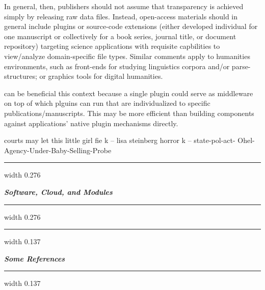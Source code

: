 \documentclass[11pt]{article}
\newcommand{\semihr}[1]{{\textcolor{orange!60!black}{\hrule width #1}}}
\newcommand{\sectnum}[1]{\hspace*{25pt}\textcolor{red!70!black}{}\hspace*{3pt}}
\newcommand{\secttitle}[1]{\textcolor{red!70!black}{\textit{\textbf{#1}}}}
\begin{document}
{{\begin{description}
\pseudoIndent{}  In general, then, publishers should not 
assume that \FAIR{} transparency is achieved simply by 
releasing raw data files.  Instead, open-access materials should 
in general include plugins or source-code extensions (either 
developed individual for one manuscript or collectively 
for a book series, journal title, or document repository) 
targeting science applications with requisite capbilities 
to view/analyze domain-specific file types.  Similar 
comments apply to humanities environments, such as 
front-ends for studying linguistics corpora and/or 
parse-structures; or graphics tools for digital humanities.

\pseudoIndent{}  \lPacTk{} can be beneficial this context 
because a single \PacTk{} plugin could serve as middleware 
on top of which plguins can run that are individualized 
to specific publications/manuscripts.  This may be more 
efficient than building components against applications' 
native plugin mechanisms directly. 

\end{description}

}







courts may let this little girl fie
k -- lisa steinberg horror
k -- state-pol-act- 
Ohel-Agency-Under-Baby-Selling-Probe




\vspace*{10pt}
{\semihr{0.276\textwidth}}
\vspace*{5pt}
\hspace{2pt}\secttitle{{Software, Cloud, and \stGUI{} Modules}}
\vspace*{5pt}
{\semihr{0.276\textwidth}}








\vspace*{10pt}
{\semihr{0.137\textwidth}}
\vspace*{5pt}
\hspace{2pt}\secttitle{{Some References}}
\vspace*{5pt}
{\semihr{0.137\textwidth}}




}
\end{document}
